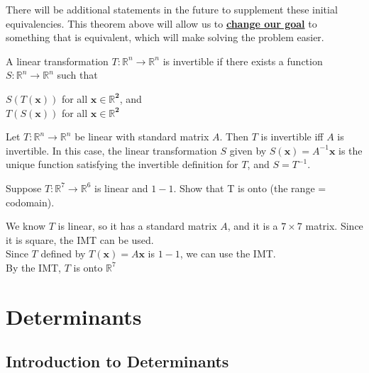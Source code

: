 \documentclass{report}
\begin{document}
There will be additional statements in the future to supplement these initial equivalencies. This theorem above will allow us to \textbf{\underline{change our goal}} to something that is equivalent, which will make solving the problem easier.

\begin{definition}
A linear transformation $T:\mathbb{R}^n\rightarrow \mathbb{R}^n$ is invertible if there exists a function $S:\mathbb{R}^n\rightarrow \mathbb{R}^n$ such that\\
\begin{center}
	$S(T(\mathbf{x}))$ for all $\mathbf{x\in \mathbb{R}^2}$, and\\
	$T(S(\mathbf{x}))$ for all $\mathbf{x\in \mathbb{R}^2}$
\end{center}
\end{definition}

\begin{theorem}
Let $T:\mathbb{R}^n\rightarrow \mathbb{R}^n$ be linear with standard matrix $A$. Then $T$ is invertible iff $A$ is invertible. In this case, the linear transformation $S$ given by $S(\mathbf{x})=A^{-1}\mathbf{x}$ is the unique function satisfying the invertible definition for $T$, and $S=T^{-1}$.
\end{theorem}

\begin{example}
Suppose $T:\mathbb{R}^7\rightarrow \mathbb{R}^6$ is linear and $1-1$. Show that T is onto (the range = codomain).\vspace{2mm}
\begin{center}
We know $T$ is linear, so it has a standard matrix $A$, and it is a $7\times 7$ matrix. Since it is square, the IMT can be used.\\\vspace{3mm}
Since $T$ defined by $T(\mathbf{x})=A\mathbf{x}$ is $1-1$, we can use the IMT.\\\vspace{3mm}
By the IMT, $T$ is onto $\mathbb{R}^7$
\end{center}
\end{example}

\chapter{Determinants}

\section{Introduction to Determinants}
\end{document}
